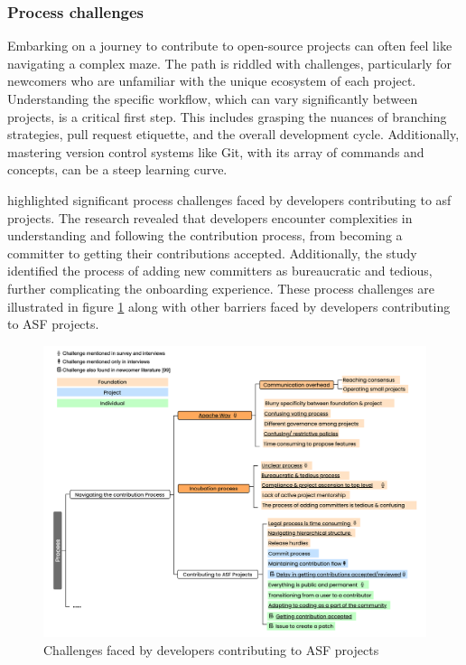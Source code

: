 \subsubsection{Process challenges}

Embarking on a journey to contribute to open-source projects can often feel like navigating a complex maze. The path is riddled with challenges, particularly for newcomers who are unfamiliar with the unique ecosystem of each project. Understanding the specific workflow, which can vary significantly between projects, is a critical first step. This includes grasping the nuances of branching strategies, pull request etiquette, and the overall development cycle. Additionally, mastering version control systems like Git, with its array of commands and concepts, can be a steep learning curve.

\citet{04guizani2021long} highlighted significant process challenges faced by developers contributing to \ac{asf} projects. The research revealed that developers encounter complexities in understanding and following the contribution process, from becoming a committer to getting their contributions accepted. Additionally, the study identified the process of adding new committers as bureaucratic and tedious, further complicating the onboarding experience. These process challenges are illustrated in figure \ref{fig:processChallenges} along with other barriers faced by developers contributing to ASF projects.

\begin{figure}[ht]
    \centering
    \includegraphics[width=1\linewidth]{figs/processChallenges.png}
    \caption{Challenges faced by developers contributing to ASF projects \citep{04guizani2021long}}
    \label{fig:processChallenges}
\end{figure}


